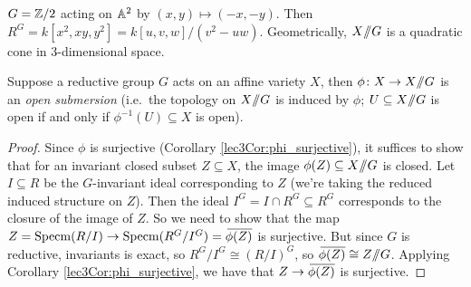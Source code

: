 \begin{example}
 $G=\ZZ/2$ acting on $\AA^2$ by $(x,y)\mapsto (-x,-y)$. Then $R^G=k[x^2,xy,y^2]=k[u,v,w]/(v^2-uw)$. Geometrically, $X\quot G$ is a quadratic cone in 3-dimensional space. 
\end{example}

\begin{proposition}
  Suppose a reductive group $G$ acts on an affine variety $X$, then $\phi\colon X\to X\quot G$ is an \emph{open submersion} (i.e.~the topology on $X\quot G$ is induced by $\phi$; $U\subseteq X\quot G$ is open if and only if $\phi^{-1}(U)\subseteq X$ is open).
\end{proposition}
\begin{proof}
 Since $\phi$ is surjective (Corollary \ref{lec3Cor:phi_surjective}), it suffices to show that for an invariant closed subset $Z\subseteq X$, the image $\phi(Z)\subseteq X\quot G$ is closed. Let $I\subseteq R$ be the $G$-invariant ideal corresponding to $Z$ (we're taking the reduced induced structure on $Z$). Then the ideal $I^G=I\cap R^G\subseteq R^G$ corresponds to the closure of the image of $Z$. So we need to show that the map $Z=\specm (R/I)\to \specm (R^G/I^G)=\bbar{\phi(Z)}$ is surjective. But since $G$ is reductive, invariants is exact, so $R^G/I^G\cong (R/I)^G$, so $\bbar{\phi(Z)}\cong Z\quot G$. Applying Corollary \ref{lec3Cor:phi_surjective}, we have that $Z\to \bbar{\phi(Z)}$ is surjective.
\end{proof}